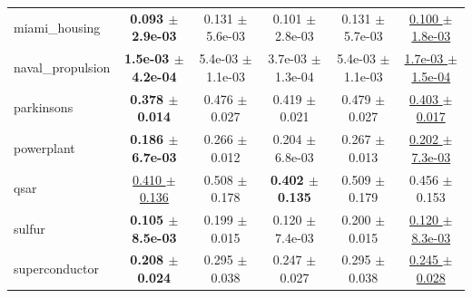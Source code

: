 \begin{table}[!htbp]
{\begin{tabular}{lccccc}
miami\_housing & \textbf{0.093 $\pm$ 2.9e-03} & 0.131 $\pm$ 5.6e-03 & 0.101 $\pm$ 2.8e-03 & 0.131 $\pm$ 5.7e-03 & \underline{0.100 $\pm$ 1.8e-03} \\
naval\_propulsion & \textbf{1.5e-03 $\pm$ 4.2e-04} & 5.4e-03 $\pm$ 1.1e-03 & 3.7e-03 $\pm$ 1.3e-04 & 5.4e-03 $\pm$ 1.1e-03 & \underline{1.7e-03 $\pm$ 1.5e-04} \\
parkinsons & \textbf{0.378 $\pm$ 0.014} & 0.476 $\pm$ 0.027 & 0.419 $\pm$ 0.021 & 0.479 $\pm$ 0.027 & \underline{0.403 $\pm$ 0.017} \\
powerplant & \textbf{0.186 $\pm$ 6.7e-03} & 0.266 $\pm$ 0.012 & 0.204 $\pm$ 6.8e-03 & 0.267 $\pm$ 0.013 & \underline{0.202 $\pm$ 7.3e-03} \\
qsar & \underline{0.410 $\pm$ 0.136} & 0.508 $\pm$ 0.178 & \textbf{0.402 $\pm$ 0.135} & 0.509 $\pm$ 0.179 & 0.456 $\pm$ 0.153 \\
sulfur & \textbf{0.105 $\pm$ 8.5e-03} & 0.199 $\pm$ 0.015 & 0.120 $\pm$ 7.4e-03 & 0.200 $\pm$ 0.015 & \underline{0.120 $\pm$ 8.3e-03} \\
superconductor & \textbf{0.208 $\pm$ 0.024} & 0.295 $\pm$ 0.038 & 0.247 $\pm$ 0.027 & 0.295 $\pm$ 0.038 & \underline{0.245 $\pm$ 0.028} \\
\bottomrule
\end{tabular}
}
\end{table}